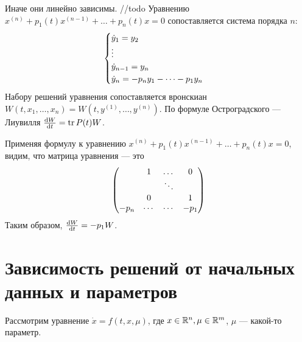 \documentclass[a4paper]{report}
\begin{document}
    Иначе они линейно зависимы.
    //todo
    Уравнению $x^{(n)} + p_1(t)x^{(n - 1)} + \dots + p_n(t)x = 0$ сопоставляется система порядка $n$:
    \[\begin{cases}\dot{y}_1 = y_2 \\\vdots \\ \dot{y}_{n-1} = y_n \\\dot{y}_n = -p_n y_1 - \dots - p_1 y_n\end{cases}\]
    Набору решений уравнения сопоставляется вронскиан $W(t, x_1, \dots, x_n) = W(t, y^{(1)}, \dots, y^{(n)})$.
    По формуле Остроградского --- Лиувилля $\frac{\operatorname{d}\! W}{\operatorname{d}\! t} = \operatorname{tr} P(t) W$.

    Применяя формулу к уравнению $x^{(n)} + p_1(t)x^{(n - 1)} + \dots + p_n(t)x = 0$, видим, что матрица уравнения --- это
    \[\begin{pmatrix} & 1 & \dots & 0 \\ && \ddots & \\ &0&&1 \\ -p_n &\cdots &\cdots & -p_1 \end{pmatrix}\]
Таким образом, $\frac{\operatorname{d}\! W}{\operatorname{d}\! t} = -p_1 W$.
    \chapter{Зависимость решений от начальных данных и параметров}
    Рассмотрим уравнение $\dot{x} = f(t, x, \mu)$, где $x \in \mathbb{R}^n, \mu \in \mathbb{R}^m$, $\mu$ --- какой-то параметр.
\end{document}

